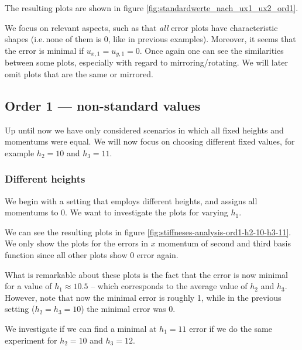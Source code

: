 \documentclass[a4paper, twoside]{article}
\begin{document}
The resulting plots are shown in figure \ref{fig:standardwerte_nach_ux1_ux2_ord1}.



We focus on relevant aspects, such as that \emph{all} error plots have characteristic shapes (i.e.\,none of them is 0, like in previous examples). Moreover, it seems that the error is minimal if $u_{x,1}=u_{y,1}=0$. Once again one can see the similarities between some plots, especially with regard to mirroring/rotating. We will later omit plots that are the same or mirrored.

\clearpage{} %

\subsection{Order 1 --- non-standard values}
\label{sec:stiffness-analysis-ord1-non-std-values}

Up until now we have only considered scenarios in which all fixed heights and momentums were equal. We will now focus on choosing different fixed values, for example $h_2=10$ and $h_3=11$.

\subsubsection{Different heights}
\label{sec:stiffness-analysis-ord1-differing-h2-10-h3-11}

We begin with a setting that employs different heights, and assigns all momentums to 0. We want to investigate the plots for varying $h_1$.



We can see the resulting plots in figure \ref{fig:stiffneses-analysis-ord1-h2-10-h3-11}. We only show the plots for the errors in $x$ momentum of second and third basis function since all other plots show 0 error again.

What is remarkable about these plots is the fact that the error is now minimal for a value of $h_1\approx 10.5$ -- which corresponds to the average value of $h_2$ and $h_3$. However, note that now the minimal error is roughly 1, while in the previous setting ($h_2=h_3=10$) the minimal error was 0.

We investigate if we can find a minimal at $h_1=11$ error if we do the same experiment for $h_2=10$ and $h_3=12$.


\end{document}
